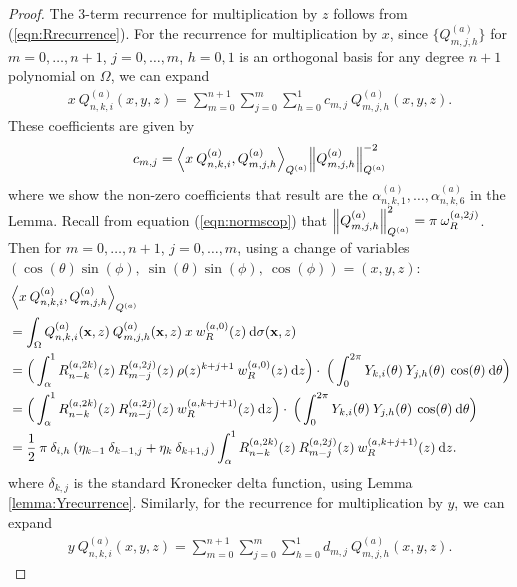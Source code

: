 \documentclass[11pt, oneside]{article}   	%
\newcommand{\half}{\frac{1}{2}}
\newcommand{\genjac}{R}
\newcommand{\genjacnmk}{\genjac_{n-k}}
\newcommand{\genjacmmj}{\genjac_{m-j}}
\newcommand{\genjacw}{w_\genjac}
\newcommand{\normgenjac}{\omega_\genjac}
\newcommand{\scop}{Q}
\newcommand{\scopnki}{\scop_{n,k,i}}
\newcommand{\scopmjh}{\scop_{m,j,h}}
\newcommand{\scopa}{\scop^{(a)}}
\newcommand{\scopnkia}{\scopnki^{(a)}}
\newcommand{\scopmjha}{\scopmjh^{(a)}}
\newcommand{\xvec}{\mathbf{x}}
\newcommand{\ch}{Y}
\newcommand{\chki}{\ch_{k,i}}
\newcommand{\chjh}{\ch_{j,h}}
\newcommand{\alphaa}{\alpha^{(a)}}
\begin{document}
\begin{proof}
The 3-term recurrence for multiplication by $z$ follows from (\ref{eqn:Rrecurrence}). For the recurrence for multiplication by $x$, since $\{\scopmjha\}$ for $m = 0,\dots,n+1$, $j = 0,\dots,m$, $h = 0,1$ is an orthogonal basis for any degree $n+1$ polynomial on $\Omega$, we can expand 
\begin{align*}
	x \: \scopnkia(x,y,z) = \sum_{m=0}^{n+1} \sum_{j=0}^m \sum_{h=0}^1 c_{m,j} \: \scopmjha(x,y,z).
\end{align*}
These coefficients are given by
\begin{align*}
	c_{m,j} = {\ip< x \: \scopnkia, \scopmjha >_{\scopa}}{\norm{\scopmjha}^{-2}_{\scopa}}
\end{align*}
where we show the non-zero coefficients that result are the $\alphaa_{n,k,1},\dots,\alphaa_{n,k,6}$ in the Lemma.
Recall from equation (\ref{eqn:normscop}) that $\norm{\scopmjha}_{\scopa}^2 = \pi \: \normgenjac^{(a,2j)}$. Then for $m = 0,\dots,n+1$, $j = 0,\dots,m$, using a change of variables $(\cos(\theta) \sin(\phi), \: \sin(\theta)\sin(\phi), \: \cos(\phi)) = (x, y, z)$:
\begin{align*}
	&\ip<x \: \scopnkia, \scopmjha>_{\scopa} \\
	&= \int_\Omega \scopnkia(\xvec,z) \: \scopmjha(\xvec,z) \: x \: \genjacw^{(a,0)}(z) \: \D\sigma(\xvec, z) \\
	&= \Big( \int^1_\alpha \genjacnmk^{(a, 2k)}(z) \: \genjacmmj^{(a, 2j)}(z) \: \rho(z)^{k+j+1} \: \genjacw^{(a, 0)}(z) \: \D z \Big) \cdot \: \Big( \int_0^{2\pi} \chki(\theta) \: \chjh(\theta) \: \cos(\theta) \: \D \theta \Big) \\
	&= \Big( \int^1_\alpha \genjacnmk^{(a, 2k)}(z) \: \genjacmmj^{(a, 2j)}(z) \: \genjacw^{(a, k + j + 1)}(z) \: \D z \Big) \cdot \: \Big( \int_0^{2\pi} \chki(\theta) \: \chjh(\theta) \: \cos(\theta) \: \D \theta \Big) \\
	&= \half \: \pi \: \delta_{i,h} \: (\eta_{k-1} \: \delta_{k-1, j} + \eta_{k} \: \delta_{k+1, j})  \int^1_\alpha \genjacnmk^{(a, 2k)}(z) \: \genjacmmj^{(a, 2j)}(z) \: \genjacw^{(a, k + j + 1)}(z) \: \D z.
\end{align*}
where $\delta_{k, j}$ is the standard Kronecker delta function, using Lemma \ref{lemma:Yrecurrence}. Similarly, for the recurrence for multiplication by $y$, we can expand 
\begin{align*}
	y \: \scopnkia(x,y,z) = \sum_{m=0}^{n+1} \sum_{j=0}^m \sum_{h=0}^1 d_{m,j} \: \scopmjha(x,y,z).
\end{align*}

\end{proof}
\end{document}
